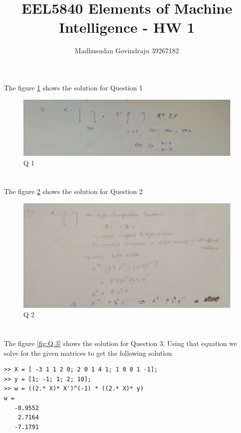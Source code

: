 \documentclass[10pt, letterpaper]{article}
\author{Madhusudan Govindraju 39267182 }
\date{}
\begin{document}
\title{EEL5840  Elements of Machine Intelligence - HW 1}
\maketitle

\section{}
 The figure \ref{fig:Q 1} shows the solution for Question 1

\begin{figure}[h!]
	\includegraphics[width=\linewidth]{1.jpg}
	\caption{Q 1}
	\label{fig:Q 1}
\end{figure}


\newpage

\section{}
 The figure \ref{fig:Q 2} shows the solution for Question 2
 \begin{figure}[h!]
	\includegraphics[width=\linewidth]{2.jpg}
	\caption{Q 2}
	\label{fig:Q 2}
\end{figure}
 
 
 \newpage

\section{} 
The figure \ref{fig:Q 3} shows the solution for Question 3. Using that equation we solve for the given matrices to get the following solution
\begin{verbatim}
>> X = [ -3 1 1 2 0; 2 0 1 4 1; 1 0 0 1 -1];
>> y = [1; -1; 1; 2; 10];
>> w = ((2.* X)* X')^(-1) * ((2.* X)* y)
w =
   -0.9552
    2.7164
   -7.1791
\end{verbatim}
\end{document}
